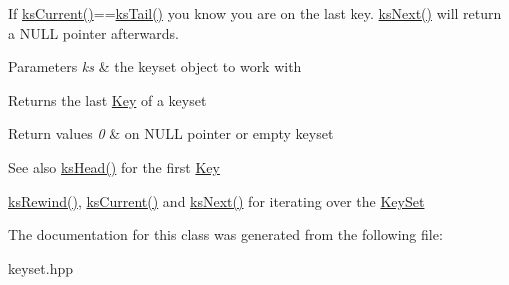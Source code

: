 If \hyperlink{group__keyset_ga4287b9416912c5f2ab9c195cb74fb094}{ks\+Current()}==\hyperlink{group__keyset_gadca442c4ab43cf532b15091d7711559e}{ks\+Tail()} you know you are on the last key. \hyperlink{group__keyset_ga317321c9065b5a4b3e33fe1c399bcec9}{ks\+Next()} will return a N\+U\+L\+L pointer afterwards.


\begin{DoxyParams}{Parameters}
{\em ks} & the keyset object to work with \\
\hline
\end{DoxyParams}
\begin{DoxyReturn}{Returns}
the last \hyperlink{classkdb_1_1Key}{Key} of a keyset 
\end{DoxyReturn}

\begin{DoxyRetVals}{Return values}
{\em 0} & on N\+U\+L\+L pointer or empty keyset \\
\hline
\end{DoxyRetVals}
\begin{DoxySeeAlso}{See also}
\hyperlink{group__keyset_gae7dbf3aef70e67b5328475eb3d1f92f5}{ks\+Head()} for the first \hyperlink{group__key}{Key} 

\hyperlink{group__keyset_gabe793ff51f1728e3429c84a8a9086b70}{ks\+Rewind()}, \hyperlink{group__keyset_ga4287b9416912c5f2ab9c195cb74fb094}{ks\+Current()} and \hyperlink{group__keyset_ga317321c9065b5a4b3e33fe1c399bcec9}{ks\+Next()} for iterating over the \hyperlink{group__keyset}{Key\+Set} 
\end{DoxySeeAlso}


The documentation for this class was generated from the following file\+:\begin{DoxyCompactItemize}
\item 
keyset.\+hpp\end{DoxyCompactItemize}

